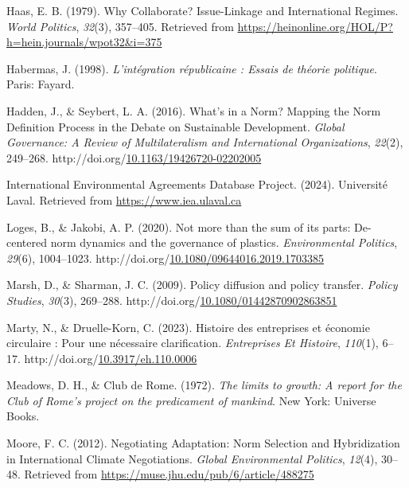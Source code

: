 \documentclass[12pt]{ulaval}
\newenvironment{CSLReferences}%
  {}%
  {\par}
\begin{document}
\begin{CSLReferences}{1}{0}
Haas, E. B. (1979). Why {Collaborate}? {Issue}-{Linkage} and {International} {Regimes}. \emph{World Politics}, \emph{32}(3), 357--405. Retrieved from \url{https://heinonline.org/HOL/P?h=hein.journals/wpot32&i=375}

Habermas, J. (1998). \emph{L'intégration républicaine : Essais de théorie politique}. Paris: Fayard.

Hadden, J., \& Seybert, L. A. (2016). What's in a {Norm}? {Mapping} the {Norm} {Definition} {Process} in the {Debate} on {Sustainable} {Development}. \emph{Global Governance: A Review of Multilateralism and International Organizations}, \emph{22}(2), 249--268. http://doi.org/\href{https://doi.org/10.1163/19426720-02202005}{10.1163/19426720-02202005}

International {Environmental} {Agreements} {Database} {Project}. (2024). Université Laval. Retrieved from \url{https://www.iea.ulaval.ca}

Loges, B., \& Jakobi, A. P. (2020). Not more than the sum of its parts: De-centered norm dynamics and the governance of plastics. \emph{Environmental Politics}, \emph{29}(6), 1004--1023. http://doi.org/\href{https://doi.org/10.1080/09644016.2019.1703385}{10.1080/09644016.2019.1703385}

Marsh, D., \& Sharman, J. C. (2009). Policy diffusion and policy transfer. \emph{Policy Studies}, \emph{30}(3), 269--288. http://doi.org/\href{https://doi.org/10.1080/01442870902863851}{10.1080/01442870902863851}

Marty, N., \& Druelle-Korn, C. (2023). Histoire des entreprises et économie circulaire : Pour une nécessaire clarification. \emph{Entreprises Et Histoire}, \emph{110}(1), 6--17. http://doi.org/\href{https://doi.org/10.3917/eh.110.0006}{10.3917/eh.110.0006}

Meadows, D. H., \& Club de Rome. (1972). \emph{The limits to growth: A report for the {Club} of {Rome}'s project on the predicament of mankind}. New York: Universe Books.

Moore, F. C. (2012). Negotiating {Adaptation}: {Norm} {Selection} and {Hybridization} in {International} {Climate} {Negotiations}. \emph{Global Environmental Politics}, \emph{12}(4), 30--48. Retrieved from \url{https://muse.jhu.edu/pub/6/article/488275}


\end{CSLReferences}
\end{document}
